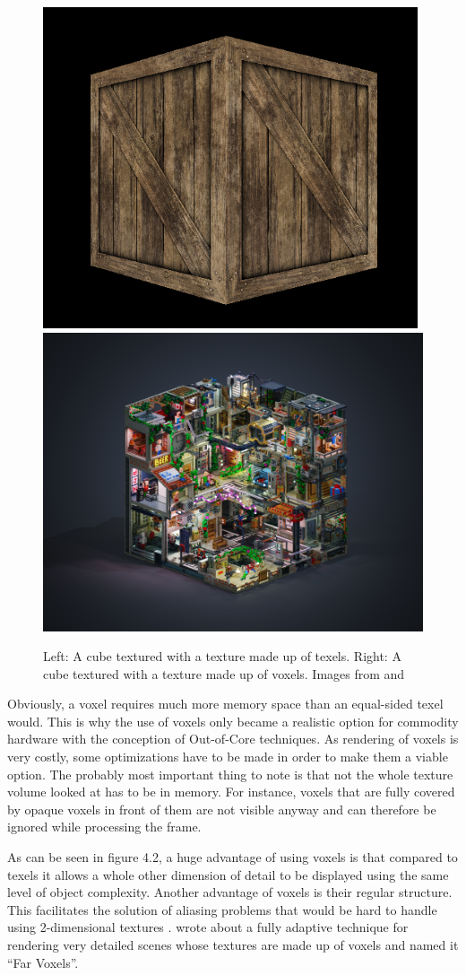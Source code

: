\begin{figure}[h]
  \begin{center}
    \includegraphics[width=.4\textwidth]{logos/texel_textured_cube.png}
    \hfill
    \includegraphics[width=.44\textwidth]{logos/voxel_textured_cube.png}
    \caption{Left: A cube textured with a texture made up of texels. Right: A cube textured with a texture made up of voxels. Images from \cite{Bej:OpenGLEx} and \cite{Ing:VoxPeop}}
  \end{center}
\end{figure}

Obviously, a voxel requires much more memory space than an equal-sided texel would. This is why the use of voxels only became a realistic option for commodity hardware with the conception of Out-of-Core techniques. As rendering of voxels is very costly, some optimizations have to be made in order to make them a viable option. The probably most important thing to note is that not the whole texture volume looked at has to be in memory. For instance, voxels that are fully covered by opaque voxels in front of them are not visible anyway and can therefore be ignored while processing the frame.

As can be seen in figure 4.2, a huge advantage of using voxels is that compared to texels it allows a whole other dimension of detail to be displayed using the same level of object complexity. Another advantage of voxels is their regular structure. This facilitates the solution of aliasing problems that would be hard to handle using 2-dimensional textures \cite{Crassin:2009:GRS:1507149.1507152}. \cite{Gobbetti:2005:FVM:1073204.1073277} wrote about a fully adaptive technique for rendering very detailed scenes whose textures are made up of voxels and named it ``Far Voxels''.

